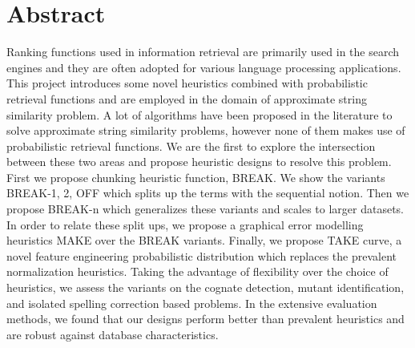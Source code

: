 


\begingroup
\let\clearpage\relax
\let\cleardoublepage\relax
\let\cleardoublepage\relax

\chapter*{Abstract}
	Ranking functions used in information retrieval are primarily used in the search engines and they are often adopted for various language processing applications.
This project introduces some novel heuristics combined with probabilistic retrieval functions and are employed in the domain of approximate string similarity problem.
A lot of algorithms have been proposed in the literature to solve approximate string similarity problems, however none of them makes use of probabilistic retrieval functions.
We are the first to explore the intersection between these two areas and propose heuristic designs to resolve this problem.
First we propose chunking heuristic function, BREAK. 
We show the variants BREAK-1, 2, OFF which splits up the terms with the sequential notion.
Then we propose BREAK-n which generalizes these variants and scales to larger datasets.
In order to relate these split ups, we propose a graphical error modelling heuristics MAKE over the BREAK variants.
Finally, we propose TAKE curve, a novel feature engineering probabilistic distribution which replaces the prevalent normalization heuristics.
Taking the advantage of flexibility over the choice of heuristics, we assess the variants on the cognate detection, mutant identification, and isolated spelling correction based problems.
In the extensive evaluation methods, we found that our designs perform better than prevalent heuristics and are robust against database characteristics.

\endgroup			

\vfill
